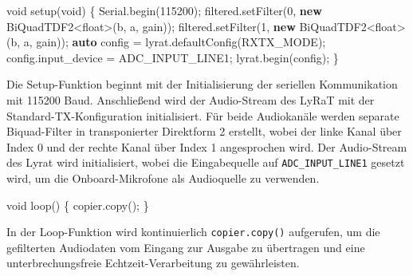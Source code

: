 \documentclass[
  ngerman,
  letterpaper,
  DIV=11]{scrreprt}
\newenvironment{Shaded}{\begin{snugshade}}{\end{snugshade}}
\newcommand{\DataTypeTok}[1]{\textcolor[rgb]{0.68,0.00,0.00}{#1}}
\newcommand{\DecValTok}[1]{\textcolor[rgb]{0.68,0.00,0.00}{#1}}
\newcommand{\KeywordTok}[1]{\textcolor[rgb]{0.00,0.23,0.31}{\textbf{#1}}}
\newcommand{\NormalTok}[1]{\textcolor[rgb]{0.00,0.23,0.31}{#1}}
\newcommand{\OperatorTok}[1]{\textcolor[rgb]{0.37,0.37,0.37}{#1}}
\begin{document}
\begin{Shaded}
\begin{Highlighting}[]
\DataTypeTok{void}\NormalTok{ setup}\OperatorTok{(}\DataTypeTok{void}\OperatorTok{)} \OperatorTok{\{}
\NormalTok{    Serial}\OperatorTok{.}\NormalTok{begin}\OperatorTok{(}\DecValTok{115200}\OperatorTok{);}
\NormalTok{    filtered}\OperatorTok{.}\NormalTok{setFilter}\OperatorTok{(}\DecValTok{0}\OperatorTok{,} \KeywordTok{new}\NormalTok{ BiQuadTDF2}\OperatorTok{\textless{}}\DataTypeTok{float}\OperatorTok{\textgreater{}(}\NormalTok{b}\OperatorTok{,}\NormalTok{ a}\OperatorTok{,}\NormalTok{ gain}\OperatorTok{));}
\NormalTok{    filtered}\OperatorTok{.}\NormalTok{setFilter}\OperatorTok{(}\DecValTok{1}\OperatorTok{,} \KeywordTok{new}\NormalTok{ BiQuadTDF2}\OperatorTok{\textless{}}\DataTypeTok{float}\OperatorTok{\textgreater{}(}\NormalTok{b}\OperatorTok{,}\NormalTok{ a}\OperatorTok{,}\NormalTok{ gain}\OperatorTok{));}
    \KeywordTok{auto}\NormalTok{ config }\OperatorTok{=}\NormalTok{ lyrat}\OperatorTok{.}\NormalTok{defaultConfig}\OperatorTok{(}\NormalTok{RXTX\_MODE}\OperatorTok{);}
\NormalTok{    config}\OperatorTok{.}\NormalTok{input\_device }\OperatorTok{=}\NormalTok{ ADC\_INPUT\_LINE1}\OperatorTok{;}
\NormalTok{    lyrat}\OperatorTok{.}\NormalTok{begin}\OperatorTok{(}\NormalTok{config}\OperatorTok{);}
\OperatorTok{\}}
\end{Highlighting}
\end{Shaded}

Die Setup-Funktion beginnt mit der Initialisierung der seriellen
Kommunikation mit 115200 Baud. Anschließend wird der Audio-Stream des
LyRaT mit der Standard-TX-Konfiguration initialisiert. Für beide
Audiokanäle werden separate Biquad-Filter in transponierter Direktform 2
erstellt, wobei der linke Kanal über Index 0 und der rechte Kanal über
Index 1 angesprochen wird. Der Audio-Stream des Lyrat wird
initialisiert, wobei die Eingabequelle auf \texttt{ADC\_INPUT\_LINE1}
gesetzt wird, um die Onboard-Mikrofone als Audioquelle zu verwenden.

\begin{Shaded}
\begin{Highlighting}[]
\DataTypeTok{void}\NormalTok{ loop}\OperatorTok{()} \OperatorTok{\{}
\NormalTok{    copier}\OperatorTok{.}\NormalTok{copy}\OperatorTok{();}
\OperatorTok{\}}
\end{Highlighting}
\end{Shaded}

In der Loop-Funktion wird kontinuierlich \texttt{copier.copy()}
aufgerufen, um die gefilterten Audiodaten vom Eingang zur Ausgabe zu
übertragen und eine unterbrechungsfreie Echtzeit-Verarbeitung zu
gewährleisten.
\end{document}
